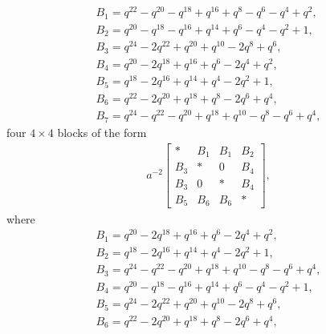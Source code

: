 \documentclass[pdftex]{sigma}
\numberwithin{equation}{section}
\theoremstyle{definition}
\newcommand{\flac}[2]{#1}
\begin{document}
\begin{gather*}
 B_1 = \flac{q^{22}}{a^2}-\flac{q^{20}}{a^2}-\flac{q^{18}}{a^2}+\flac{q^{16}}{a^2}+\flac{q^{8}}{a^2}-\flac{q^{6}}{a^2}-\flac{q^{4}}{a^2}+\flac{q^{2}}{a^2}, \\
 B_2 = \flac{q^{20}}{a^2}-\flac{q^{18}}{a^2}-\flac{q^{16}}{a^2}+\flac{q^{14}}{a^2}+\flac{q^{6}}{a^2}-\flac{q^{4}}{a^2}-\flac{q^{2}}{a^2}+\flac{1}{a^2}, \\
 B_3 = \flac{q^{24}}{a^2}-\flac{2q^{22}}{a^2}+\flac{q^{20}}{a^2}+\flac{q^{10}}{a^2}-\flac{2q^{8}}{a^2}+\flac{q^{6}}{a^2}, \\
 B_4 = \flac{q^{20}}{a^2}-\flac{2q^{18}}{a^2}+\flac{q^{16}}{a^2}+\flac{q^{6}}{a^2}-\flac{2q^{4}}{a^2}+\flac{q^{2}}{a^2}, \\
 B_5 = \flac{q^{18}}{a^2}-\flac{2q^{16}}{a^2}+\flac{q^{14}}{a^2}+\flac{q^{4}}{a^2}-\flac{2q^{2}}{a^2}+\flac{1}{a^2}, \\
 B_6 = \flac{q^{22}}{a^2}-\flac{2q^{20}}{a^2}+\flac{q^{18}}{a^2}+\flac{q^{8}}{a^2}-\flac{2q^{6}}{a^2}+\flac{q^{4}}{a^2},\\
 B_7 = \flac{q^{24}}{a^2}-\flac{q^{22}}{a^2}-\flac{q^{20}}{a^2}+\flac{q^{18}}{a^2}+\flac{q^{10}}{a^2}-\flac{q^{8}}{a^2}-\flac{q^{6}}{a^2}+\flac{q^{4}}{a^2},
\end{gather*}
four $4 \times 4$ blocks of the form
\begin{align*}
 a^{-2}\begin{bmatrix}
 * & B_1 & B_1 & B_2 \\
 B_3 & * & 0 & B_4 \\
 B_3 & 0 & * & B_4 \\
 B_5 & B_6 & B_6 & *
 \end{bmatrix},
\end{align*}
where
\begin{gather*}
 B_1 = \flac{q^{20}}{a^2}-\flac{2q^{18}}{a^2}+\flac{q^{16}}{a^2}+\flac{q^{6}}{a^2}-\flac{2q^{4}}{a^2}+\flac{q^{2}}{a^2}, \\
 B_2 = \flac{q^{18}}{a^2}-\flac{2q^{16}}{a^2}+\flac{q^{14}}{a^2}+\flac{q^{4}}{a^2}-\flac{2q^{2}}{a^2}+\flac{1}{a^2}, \\
 B_3 = \flac{q^{24}}{a^2}-\flac{q^{22}}{a^2}-\flac{q^{20}}{a^2}+\flac{q^{18}}{a^2}+\flac{q^{10}}{a^2}-\flac{q^{8}}{a^2}-\flac{q^{6}}{a^2}+\flac{q^{4}}{a^2}, \\
 B_4 = \flac{q^{20}}{a^2}-\flac{q^{18}}{a^2}-\flac{q^{16}}{a^2}+\flac{q^{14}}{a^2}+\flac{q^{6}}{a^2}-\flac{q^{4}}{a^2}-\flac{q^{2}}{a^2}+\flac{1}{a^2}, \\
 B_5 = \flac{q^{24}}{a^2}-\flac{2q^{22}}{a^2}+\flac{q^{20}}{a^2}+\flac{q^{10}}{a^2}-\flac{2q^{8}}{a^2}+\flac{q^{6}}{a^2}, \\
 B_6 = \flac{q^{22}}{a^2}-\flac{2q^{20}}{a^2}+\flac{q^{18}}{a^2}+\flac{q^{8}}{a^2}-\flac{2q^{6}}{a^2}+\flac{q^{4}}{a^2},
\end{gather*}
\end{document}
